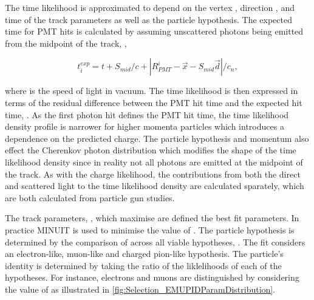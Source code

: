 The time likelihood is approximated to depend on the vertex , direction , and time  of the track parameters as well as the particle hypothesis. The expected time for PMT hits is calculated by assuming unscattered photons being emitted from the midpoint of the track, ,

\begin{equation}
  t^{exp}_{i} = t + S_{mid}/c + |R_{PMT}^{i} - \vec{x} - S_{mid}\vec{d}|/c_{n},
\end{equation}

where  is the speed of light in vacuum. The time likelihood is then expressed in terms of the residual difference between the PMT hit time and the expected hit time, . As the first photon hit defines the PMT hit time, the time likelihood density profile is narrower for higher momenta particles which introduces a dependence on the predicted charge. The particle hypothesis and momentum also effect the Cherenkov photon distribution which modifies the shape of the time likelihood density since in reality not all photons are emitted at the midpoint of the track. As with the charge likelihood, the contributions from both the direct and scattered light to the time likelihood density are calculated sparately, which are both calculated from particle gun studies.

The track parameters, \quickmath{\vec{\theta}}, which maximise  are defined the best fit parameters. In practice MINUIT \cite{James:2296388} is used to minimise the value of . The particle hypothesis is determined by the comparison of   across all viable hypotheses, \quickmath{\Gamma}. The fit considers an electron-like, muon-like and charged pion-like hypothesis. The particle's identity is determined by taking the ratio of the liklelihoods of each of the hypotheses. For instance, electrons and muons are distinguished by considering the value of  as illustrated in \autoref{fig:Selection_EMUPIDParamDistribution}.


